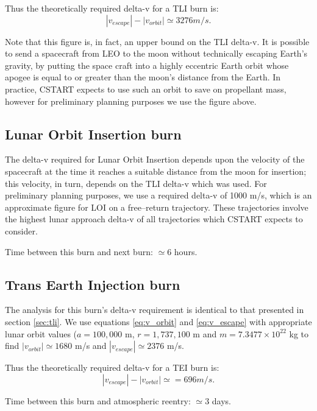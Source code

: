 \documentclass{report}
\begin{document}
Thus the theoretically required delta-v for a TLI burn is:
\begin{equation}
|v_{escape}| - |v_{orbit}| \simeq 3276 m/s.
\end{equation}

Note that this figure is, in fact, an upper bound on the TLI delta-v.  It is possible to send a spacecraft from LEO to the moon without technically escaping Earth's gravity, by putting the space craft into a highly eccentric Earth orbit whose apogee is equal to or greater than the moon's distance from the Earth.  In practice, CSTART expects to use such an orbit to save on propellant mass, however for preliminary planning purposes we use the figure above.

\subsection{Lunar Orbit Insertion burn}

The delta-v required for Lunar Orbit Insertion depends upon the velocity of the spacecraft at the time it reaches a suitable distance from the moon for insertion; this velocity, in turn, depends on the TLI delta-v which was used.  For preliminary planning purposes, we use a required delta-v of 1000 m/s, which is an approximate figure for LOI on a free--return trajectory.  These trajectories involve the highest lunar approach delta-v of all trajectories which CSTART expects to consider.

Time between this burn and next burn: $\simeq 6$ hours.

\subsection{Trans Earth Injection burn}

The analysis for this burn's delta-v requirement is identical to that presented in section \ref{sec:tli}.  We use equations \ref{eq:v_orbit} and \ref{eq:v_escape} with appropriate lunar orbit values ($a = 100,000$ m, $r = 1,737,100$ m and $m = 7.3477 \times 10^{22}$ kg to find $|v_{orbit}| \simeq 1680$ m/s and $|v_{escape}| \simeq 2376$ m/s.

Thus the theoretically required delta-v for a TEI burn is:
\begin{equation}
|v_{escape}| - |v_{orbit}| \simeq = 696 m/s.
\end{equation}

Time between this burn and atmospheric reentry: $\simeq 3$ days.
\end{document}
